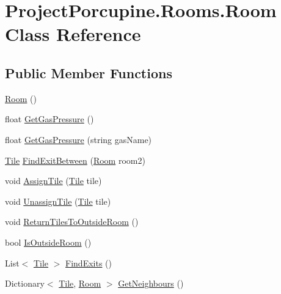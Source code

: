 \hypertarget{class_project_porcupine_1_1_rooms_1_1_room}{}\section{Project\+Porcupine.\+Rooms.\+Room Class Reference}
\label{class_project_porcupine_1_1_rooms_1_1_room}
\subsection*{Public Member Functions}
\begin{DoxyCompactItemize}
\item 
\hyperlink{class_project_porcupine_1_1_rooms_1_1_room_a7cc8174274715699a84febf026b3fef2}{Room} ()
\item 
float \hyperlink{class_project_porcupine_1_1_rooms_1_1_room_acc893c63ba85f733ec98ebd9527a9d9a}{Get\+Gas\+Pressure} ()
\item 
float \hyperlink{class_project_porcupine_1_1_rooms_1_1_room_ab7369c19b06723b1226152c886f3a247}{Get\+Gas\+Pressure} (string gas\+Name)
\item 
\hyperlink{class_tile}{Tile} \hyperlink{class_project_porcupine_1_1_rooms_1_1_room_ae232d723d0539d975370462833a098e6}{Find\+Exit\+Between} (\hyperlink{class_project_porcupine_1_1_rooms_1_1_room}{Room} room2)
\item 
void \hyperlink{class_project_porcupine_1_1_rooms_1_1_room_a802764bba9b7775f59aac5e82c656440}{Assign\+Tile} (\hyperlink{class_tile}{Tile} tile)
\item 
void \hyperlink{class_project_porcupine_1_1_rooms_1_1_room_a40bf24f1f70ac7ab4e8d19b4d1c65051}{Unassign\+Tile} (\hyperlink{class_tile}{Tile} tile)
\item 
void \hyperlink{class_project_porcupine_1_1_rooms_1_1_room_a517d532393467695e4315f278d26ad9d}{Return\+Tiles\+To\+Outside\+Room} ()
\item 
bool \hyperlink{class_project_porcupine_1_1_rooms_1_1_room_a9ede3351030861c0549fe75fa1083a24}{Is\+Outside\+Room} ()
\item 
List$<$ \hyperlink{class_tile}{Tile} $>$ \hyperlink{class_project_porcupine_1_1_rooms_1_1_room_a1894d540b292baf724f353b8f6e283a1}{Find\+Exits} ()
\item 
Dictionary$<$ \hyperlink{class_tile}{Tile}, \hyperlink{class_project_porcupine_1_1_rooms_1_1_room}{Room} $>$ \hyperlink{class_project_porcupine_1_1_rooms_1_1_room_a1caf1f4b954b00e4eb9360350e0c834b}{Get\+Neighbours} ()

\end{DoxyCompactItemize}
